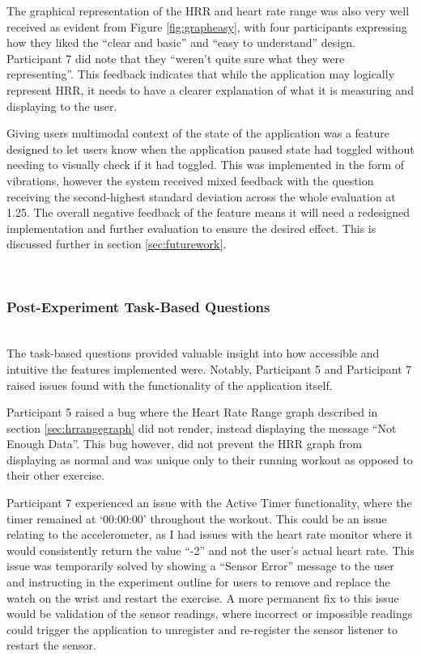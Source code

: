 \documentclass{l4proj}
\begin{document}
The graphical representation of the HRR and heart rate range was also very well received as evident from Figure \ref{fig:grapheasy}, with four participants expressing how they liked the “clear and basic” and “easy to understand” design. Participant 7 did note that they “weren’t quite sure what they were representing”. This feedback indicates that while the application may logically represent HRR, it needs to have a clearer explanation of what it is measuring and displaying to the user.

Giving users multimodal context of the state of the application was a feature designed to let users know when the application paused state had toggled without needing to visually check if it had toggled. This was implemented in the form of vibrations, however the system received mixed feedback with the question receiving the second-highest standard deviation across the whole evaluation at 1.25. The overall negative feedback of the feature means it will need a redesigned implementation and further evaluation to ensure the desired effect. This is discussed further in section \ref{sec:futurework}.

\noindent\mbox{}\\
\subsubsection{Post-Experiment Task-Based Questions}
\noindent\mbox{}\\

The task-based questions provided valuable insight into how accessible and intuitive the features implemented were. Notably, Participant 5 and Participant 7 raised issues found with the functionality of the application itself. 

Participant 5 raised a bug where the Heart Rate Range graph described in section \ref{sec:hrrangegraph} did not render, instead displaying the message “Not Enough Data”. This bug however, did not prevent the HRR graph from displaying as normal and was unique only to their running workout as opposed to their other exercise. 

Participant 7 experienced an issue with the Active Timer functionality, where the timer remained at ‘00:00:00’ throughout the workout. This could be an issue relating to the accelerometer, as I had issues with the heart rate monitor where it would consistently return the value “-2” and not the user’s actual heart rate. This issue was temporarily solved by showing a “Sensor Error” message to the user and instructing in the experiment outline for users to remove and replace the watch on the wrist and restart the exercise. A more permanent fix to this issue would be validation of the sensor readings, where incorrect or impossible readings could trigger the application to unregister and re-register the sensor listener to restart the sensor.
\end{document}
